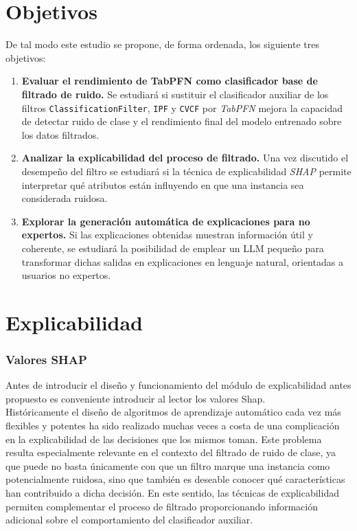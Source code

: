 \documentclass[print, color]{ugrTFG}
\begin{document}
\section{Objetivos}
De tal modo este estudio se propone, de forma ordenada, los siguiente tres objetivos:
\begin{enumerate}
    \item \textbf{Evaluar el rendimiento de TabPFN como clasificador base de filtrado de ruido.}
    Se estudiará si sustituir el clasificador auxiliar de los filtros \texttt{ClassificationFilter}, \texttt{IPF} y \texttt{CVCF} por \textit{TabPFN} mejora la capacidad de detectar ruido de clase y el rendimiento final del modelo entrenado sobre los datos filtrados.
    
    \item \textbf{Analizar la explicabilidad del proceso de filtrado.}
    Una vez discutido el desempeño del filtro se estudiará si la técnica de explicabilidad \textit{SHAP} permite interpretar qué atributos están influyendo en que una instancia sea considerada ruidosa. 
    
    \item \textbf{Explorar la generación automática de explicaciones para no expertos.}
    Si las explicaciones obtenidas muestran información útil y coherente, se estudiará la posibilidad de emplear un LLM pequeño para transformar dichas salidas en explicaciones en lenguaje natural, orientadas a usuarios no expertos.
\end{enumerate}


\section{Explicabilidad}
 \subsubsection{Valores SHAP}
    Antes de introducir el diseño y funcionamiento del módulo de explicabilidad antes propuesto es conveniente introducir al lector los valores Shap\cite{lundberg2017unifiedapproachinterpretingmodel}.\\

    
   Históricamente el diseño de algoritmos de aprendizaje automático cada vez más flexibles y potentes ha sido realizado muchas veces a costa de una complicación en la explicabilidad de las decisiones que los mismos toman. Este problema resulta especialmente relevante en el contexto del filtrado de ruido de clase, ya que puede no basta únicamente con que un filtro marque una instancia como potencialmente ruidosa, sino que también es deseable conocer qué características han contribuido a dicha decisión. En este sentido, las técnicas de explicabilidad permiten complementar el proceso de filtrado proporcionando información adicional sobre el comportamiento del clasificador auxiliar.\\
    
\end{document}
